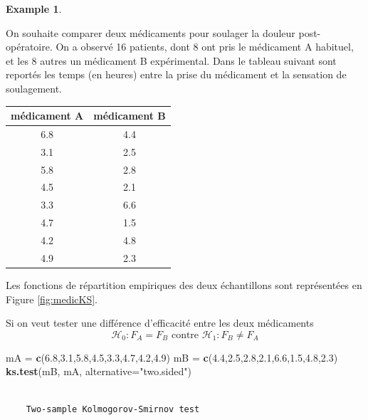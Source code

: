 \documentclass[
]{book}
\newenvironment{Shaded}{\begin{snugshade}}{\end{snugshade}}
\newcommand{\DataTypeTok}[1]{\textcolor[rgb]{0.13,0.29,0.53}{#1}}
\newcommand{\FloatTok}[1]{\textcolor[rgb]{0.00,0.00,0.81}{#1}}
\newcommand{\KeywordTok}[1]{\textcolor[rgb]{0.13,0.29,0.53}{\textbf{#1}}}
\newcommand{\NormalTok}[1]{#1}
\newcommand{\StringTok}[1]{\textcolor[rgb]{0.31,0.60,0.02}{#1}}
\theoremstyle{definition}
\theoremstyle{definition}
\newtheorem{example}{Example}[chapter]
\theoremstyle{definition}
\theoremstyle{definition}
\theoremstyle{remark}
\begin{document}
\begin{example}
\protect\hypertarget{exm:unlabeled-div-27}{}\label{exm:unlabeled-div-27}

On souhaite comparer deux médicaments pour soulager la douleur post-opératoire. On a
observé 16 patients, dont 8 ont pris le médicament A habituel, et les 8 autres un médicament B
expérimental. Dans le tableau suivant sont reportés les temps (en heures) entre la prise du
médicament et la sensation de soulagement.

\begin{tabular}{c|c}
\hline
médicament A & médicament B\\
\hline
6.8 & 4.4\\
\hline
3.1 & 2.5\\
\hline
5.8 & 2.8\\
\hline
4.5 & 2.1\\
\hline
3.3 & 6.6\\
\hline
4.7 & 1.5\\
\hline
4.2 & 4.8\\
\hline
4.9 & 2.3\\
\hline
\end{tabular}

Les fonctions de répartition empiriques des deux échantillons sont représentées en Figure \ref{fig:medicKS}.

Si on veut tester une différence d'efficacité entre les deux médicaments
\[\mathcal{H}_0: F_A = F_B \textrm{ contre }\mathcal{H}_1: F_B\neq F_A\]

\begin{Shaded}
\begin{Highlighting}[]
\NormalTok{mA =}\StringTok{ }\KeywordTok{c}\NormalTok{(}\FloatTok{6.8}\NormalTok{,}\FloatTok{3.1}\NormalTok{,}\FloatTok{5.8}\NormalTok{,}\FloatTok{4.5}\NormalTok{,}\FloatTok{3.3}\NormalTok{,}\FloatTok{4.7}\NormalTok{,}\FloatTok{4.2}\NormalTok{,}\FloatTok{4.9}\NormalTok{)}
\NormalTok{mB =}\StringTok{ }\KeywordTok{c}\NormalTok{(}\FloatTok{4.4}\NormalTok{,}\FloatTok{2.5}\NormalTok{,}\FloatTok{2.8}\NormalTok{,}\FloatTok{2.1}\NormalTok{,}\FloatTok{6.6}\NormalTok{,}\FloatTok{1.5}\NormalTok{,}\FloatTok{4.8}\NormalTok{,}\FloatTok{2.3}\NormalTok{)}
\KeywordTok{ks.test}\NormalTok{(mB, mA, }\DataTypeTok{alternative=}\StringTok{"two.sided"}\NormalTok{)}
\end{Highlighting}
\end{Shaded}

\begin{verbatim}

    Two-sample Kolmogorov-Smirnov test


\end{verbatim}
\end{example}
\end{document}
